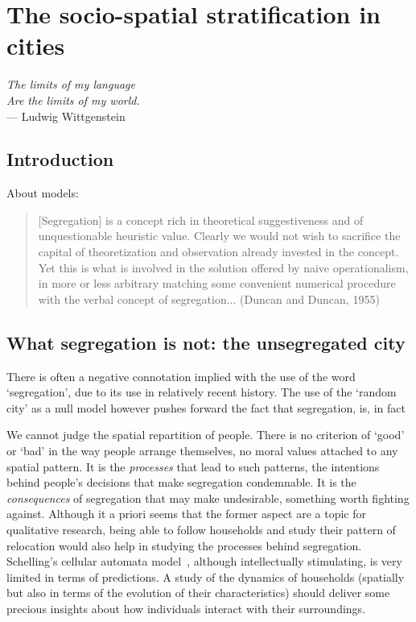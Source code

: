 %
\chapter{The socio-spatial stratification in cities}
\label{sec:concepts}


\begin{flushright}{\slshape    
The limits of my language\\
Are the limits of my world.} \\ \medskip
--- Ludwig Wittgenstein 
\end{flushright}

\section{Introduction}
\label{sec:introduction}

About models: \cite{Gauvin:2013, Brueckner:1999, Glaeser:2008}

\begin{quote}
    [Segregation] is a concept rich in theoretical suggestiveness and of
    unquestionable heuristic value. Clearly we would not wish to sacrifice the
    capital of theoretization and observation already invested in the concept.
    Yet this is what is involved in the solution offered by naive
    operationalism, in more or less arbitrary matching some convenient numerical
    procedure with the verbal concept of segregation... (Duncan and Duncan, 1955)
\end{quote}

\section{What segregation is not: the unsegregated city}
\label{sec:null_model_the_unsegregated_city}



There is often a negative connotation implied with the use of the word
`segregation', due to its use in relatively recent history. The use of the
`random city' as a null model however pushes forward the fact that segregation,
is, in fact 

We cannot judge the spatial repartition of people. There is no criterion of
`good' or `bad' in the way people arrange themselves, no moral values attached 
to any spatial pattern. It is the \emph{processes} that lead to such
patterns, the intentions behind people's decisions that make segregation
condemnable. It is the \emph{consequences} of segregation that may make
undesirable, something worth fighting against. Although it a priori seems that
the former aspect are a topic for qualitative research, being able to follow
households and study their pattern of relocation would also help in studying
the processes behind segregation. Schelling's cellular automata
model~\cite{Schelling:1971}, although intellectually stimulating, is very
limited in terms of predictions. A study of the dynamics of households
(spatially but also in terms of the evolution of their characteristics) should
deliver some precious insights about how individuals interact with their
surroundings.


